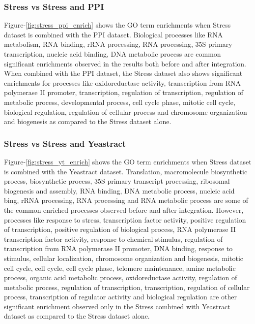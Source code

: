 \subsubsection{Stress vs Stress and PPI} 
Figure-\ref{fig:stress_ppi_enrich} shows the GO term enrichments when Stress dataset is combined with the PPI dataset. Biological processes like RNA metabolism, 
RNA binding, rRNA processing, RNA processing, 35S primary transcription, nucleic acid binding, DNA metabolic process are common 
significant enrichments observed in the results both before and after integration. When combined with the PPI dataset, the Stress dataset also shows significant enrichments 
for processes like oxidoreductase activity, 
transcription from RNA polymerase II promoter, transcription, regulation of transcription, regulation of metabolic process, developmental process, cell cycle phase, 
mitotic cell cycle, biological regulation, regulation of cellular process and chromosome organization and biogenesis as compared to the Stress dataset alone.

\subsubsection{Stress vs Stress and Yeastract} 
Figure-\ref{fig:stress_yt_enrich} shows the GO term enrichments when Stress dataset is combined with the Yeastract dataset. Translation, macromolecule biosynthetic process, biosynthetic process, 35S primary transcript processing, ribosomal biogenesis and assembly, RNA binding, DNA metabolic process, 
nucleic acid bing, rRNA processing, RNA processing and RNA metabolic process are some of the common enriched processes observed before and after integration. 
However, processes like response to stress, transcription factor activity, positive regulation of transcription, positive regulation of biological process, 
RNA polymerase II transcription factor activity, response to chemical stimulus, regulation of transcription from RNA polymerase II promoter, 
DNA binding, response to stimulus, cellular localization, chromosome organization and biogenesis, mitotic cell cycle, cell cycle, cell cycle phase, 
telomere maintenance, amine metabolic process, organic acid metabolic process, oxidoreductase activity, regulation of metabolic process, regulation of transcription, transcription, 
regulation of cellular process, transcription of regulator activity and biological regulation are other significant enrichment observed only 
in the Stress combined with Yeastract dataset as compared to the Stress dataset alone.

